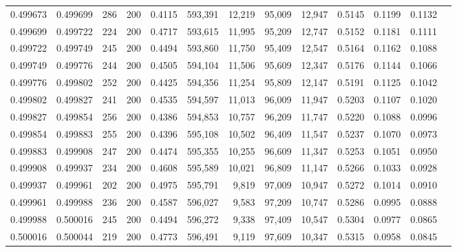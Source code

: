 \begin{tabular}{rrrrrrrrrrrrr}
0.499673 & 0.499699 &    286 & 200 &                                     0.4115 & 593,391 &  12,219 &  95,009 &  12,947 & 0.5145 & 0.1199 & 0.1132 \\
0.499699 & 0.499722 &    224 & 200 &                                     0.4717 & 593,615 &  11,995 &  95,209 &  12,747 & 0.5152 & 0.1181 & 0.1111 \\
0.499722 & 0.499749 &    245 & 200 &                                     0.4494 & 593,860 &  11,750 &  95,409 &  12,547 & 0.5164 & 0.1162 & 0.1088 \\
0.499749 & 0.499776 &    244 & 200 &                                     0.4505 & 594,104 &  11,506 &  95,609 &  12,347 & 0.5176 & 0.1144 & 0.1066 \\
0.499776 & 0.499802 &    252 & 200 &                                     0.4425 & 594,356 &  11,254 &  95,809 &  12,147 & 0.5191 & 0.1125 & 0.1042 \\
0.499802 & 0.499827 &    241 & 200 &                                     0.4535 & 594,597 &  11,013 &  96,009 &  11,947 & 0.5203 & 0.1107 & 0.1020 \\
0.499827 & 0.499854 &    256 & 200 &                                     0.4386 & 594,853 &  10,757 &  96,209 &  11,747 & 0.5220 & 0.1088 & 0.0996 \\
0.499854 & 0.499883 &    255 & 200 &                                     0.4396 & 595,108 &  10,502 &  96,409 &  11,547 & 0.5237 & 0.1070 & 0.0973 \\
0.499883 & 0.499908 &    247 & 200 &                                     0.4474 & 595,355 &  10,255 &  96,609 &  11,347 & 0.5253 & 0.1051 & 0.0950 \\
0.499908 & 0.499937 &    234 & 200 &                                     0.4608 & 595,589 &  10,021 &  96,809 &  11,147 & 0.5266 & 0.1033 & 0.0928 \\
0.499937 & 0.499961 &    202 & 200 &                                     0.4975 & 595,791 &   9,819 &  97,009 &  10,947 & 0.5272 & 0.1014 & 0.0910 \\
0.499961 & 0.499988 &    236 & 200 &                                     0.4587 & 596,027 &   9,583 &  97,209 &  10,747 & 0.5286 & 0.0995 & 0.0888 \\
0.499988 & 0.500016 &    245 & 200 &                                     0.4494 & 596,272 &   9,338 &  97,409 &  10,547 & 0.5304 & 0.0977 & 0.0865 \\
0.500016 & 0.500044 &    219 & 200 &                                     0.4773 & 596,491 &   9,119 &  97,609 &  10,347 & 0.5315 & 0.0958 & 0.0845 \\

\end{tabular}

